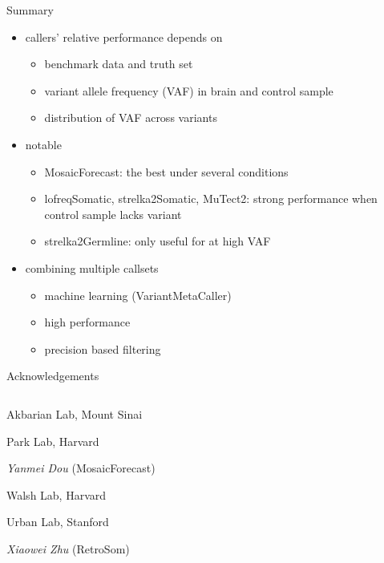 \documentclass{beamer}
\begin{document}
\begin{frame}{Summary}
\begin{itemize}
\item callers' relative performance depends on
\begin{itemize}
\item benchmark data and truth set
\item variant allele frequency (VAF) in brain and control sample
\item distribution of VAF across variants
\end{itemize}
\item notable
\begin{itemize}
\item MosaicForecast: the best under several conditions 
\item lofreqSomatic, strelka2Somatic, MuTect2: strong performance when control sample lacks variant 
\item strelka2Germline: only useful for at high VAF
\end{itemize}
\item combining multiple callsets
\begin{itemize}
\item machine learning (VariantMetaCaller)
\item high performance
\item precision based filtering 
\end{itemize} 
\end{itemize}
\end{frame}

\begin{frame}{Acknowledgements}
\begin{columns}[t]
\begin{column}{0.5\textwidth}
\alert{Akbarian Lab, Mount Sinai}

\vspace{1em}
\alert{Park Lab, Harvard}

\emph{Yanmei Dou} (MosaicForecast)

\vspace{1em}
\alert{Walsh Lab, Harvard}

\vspace{1em}
\alert{Urban Lab, Stanford}

\emph{Xiaowei Zhu} (RetroSom)

\end{column}

\begin{column}{0.5\textwidth}
\end{column}
\end{columns}
\end{frame}
\end{document}
